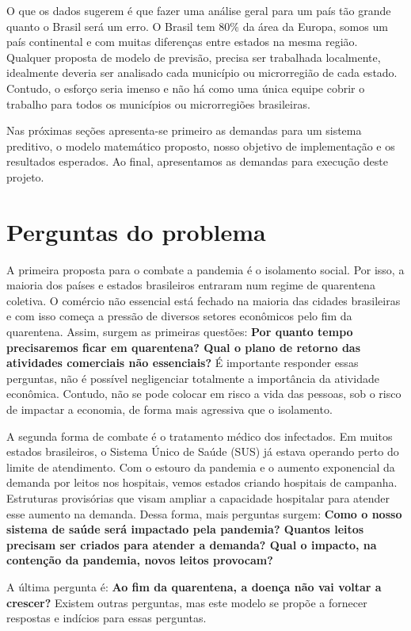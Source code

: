 \documentclass[12pt,a4papper]{article}
\begin{document}
O que os dados sugerem é que fazer uma análise geral para um país tão grande quanto o Brasil será um erro. O Brasil tem $80\%$ da área da Europa, somos um país continental e com muitas diferenças entre estados na mesma região. Qualquer proposta de modelo de previsão, precisa ser trabalhada localmente, idealmente deveria ser analisado cada município ou microrregião de cada estado. Contudo, o esforço seria imenso e não há como uma única equipe cobrir o trabalho para todos os municípios ou microrregiões brasileiras. 

Nas próximas seções apresenta-se primeiro as demandas para um sistema preditivo, o modelo matemático proposto, nosso objetivo de implementação e os resultados esperados. Ao final, apresentamos as demandas para execução deste projeto.

\section{Perguntas do problema}

A primeira proposta para o combate a pandemia é o isolamento social. Por isso, a maioria dos países e estados brasileiros entraram num regime de quarentena coletiva. O comércio não essencial está fechado na maioria das cidades brasileiras e com isso começa a pressão de diversos setores econômicos pelo fim da quarentena. Assim, surgem as primeiras questões: \textbf{Por quanto tempo precisaremos ficar em quarentena? Qual o plano de retorno das atividades comerciais não essenciais?} É importante responder essas perguntas, não é possível negligenciar totalmente a importância da atividade econômica. Contudo, não se pode colocar em risco a vida das pessoas, sob o risco de impactar a economia, de forma mais agressiva que o isolamento.

A segunda forma de combate é o tratamento médico dos infectados. Em muitos estados brasileiros, o Sistema Único de Saúde (SUS) já estava operando perto do limite de atendimento. Com o estouro da pandemia e o aumento exponencial da demanda por leitos nos hospitais, vemos estados criando hospitais de campanha. Estruturas provisórias que visam ampliar a capacidade hospitalar para atender esse aumento na demanda. Dessa forma, mais perguntas surgem: \textbf{Como o nosso sistema de saúde será impactado pela pandemia? Quantos leitos precisam ser criados para atender a demanda? Qual o impacto, na contenção da pandemia, novos leitos provocam?}

A última pergunta é: \textbf{Ao fim da quarentena, a doença não vai voltar a crescer?} Existem outras perguntas, mas este modelo se propõe a fornecer respostas e indícios para essas perguntas.
\end{document}
